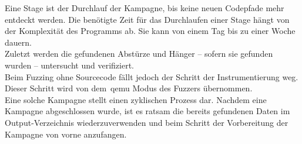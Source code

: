 Eine Stage ist der Durchlauf der Kampagne, bis keine neuen Codepfade mehr entdeckt werden.
Die benötigte Zeit für das Durchlaufen einer Stage hängt von der Komplexität des Programms ab.
Sie kann von einem Tag bis zu einer Woche dauern.\\
\linebreak
Zuletzt werden die gefundenen Abstürze und Hänger -- sofern sie gefunden wurden -- untersucht und verifiziert.\\
Beim Fuzzing ohne Sourcecode fällt jedoch der Schritt der Instrumentierung weg.
Dieser Schritt wird von dem~\gls{qemu} Modus des Fuzzers übernommen.\\
\linebreak
Eine solche Kampagne stellt einen zyklischen Prozess dar.
Nachdem eine Kampagne abgeschlossen wurde, ist es ratsam die bereits gefundenen Daten im Output-Verzeichnis wiederzuverwenden
und beim Schritt der Vorbereitung der Kampagne von vorne anzufangen.



